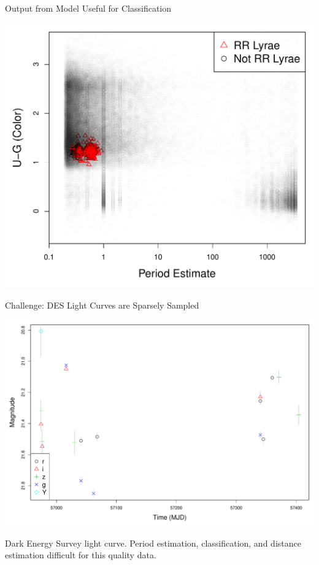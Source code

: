 \documentclass[12pt]{beamer}
\begin{document}
\begin{frame}{Output from Model Useful for Classification}

\begin{center}
\includegraphics[scale=.4]{figs/sdss_color_period.pdf}
\end{center}



\end{frame}


\begin{frame}{Challenge: DES Light Curves are Sparsely Sampled}


\begin{center}
\includegraphics[scale=.3]{figs/des_2.pdf}
\end{center}

\vspace{-.2in}

\begin{center}
\small{Dark Energy Survey light curve. Period estimation, classification, and distance estimation difficult for this quality data.}
\end{center}

\end{frame}
\end{document}
